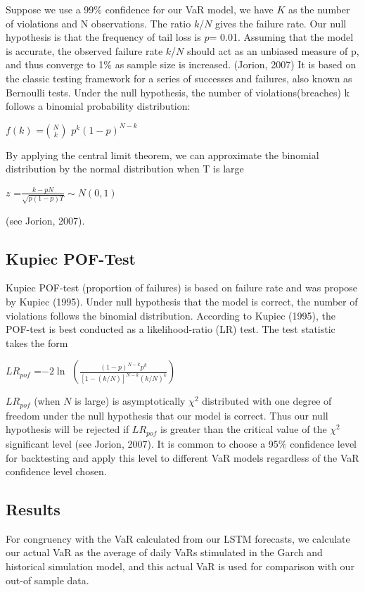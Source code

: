 \documentclass[a4paper,11pt,oneside]{book}
\begin{document}
Suppose we use a 99\% confidence for our VaR model, we have $K$ as the number of violations and N observations. The ratio $k$/$N$ gives the failure rate. Our null hypothesis is that the frequency of tail loss is $p$= 0.01. Assuming that the model is accurate, the observed failure rate $k$/$N$
should act as an unbiased measure of p, and thus converge to 1\% as sample size is
increased. (Jorion, 2007) \newline\newline
It is based on the classic testing framework for a series of successes and failures, also known as Bernoulli tests. Under the null hypothesis, the number of violations(breaches) k follows a binomial probability distribution:
\begin{center}
	$f(k)$ =$N \choose {k}$ $p^{k}(1-p)^{N-k}$ 
\end{center}

By applying the central limit theorem, we can approximate the binomial distribution by the normal distribution when T is large
\begin{center}
	$z$ =$\frac{k-pN}{\sqrt{p(1-p)T}}\sim N(0,1)$ 
\end{center}
(see Jorion, 2007).\newline

\subsection{Kupiec POF-Test}
Kupiec POF-test (proportion of failures) is based on failure rate and was propose by Kupiec (1995). Under null
hypothesis that the model is correct, the number of violations follows the
binomial distribution. According to Kupiec
(1995), the POF-test is best conducted as a likelihood-ratio (LR) test. The test
statistic takes the form
\begin{center}
	$LR_{pof}$ =$-2\ln$ $\left(\frac{(1-p)^{N-k}p^k}{[1-(k/N)]^{N-k}(k/N)^k}\right)$
\end{center}
$LR_{pof}$ (when $N$ is large) is asymptotically $\chi^2$ distributed with one degree of freedom under the null hypothesis that our model is correct. Thus our null hypothesis will be rejected if $LR_{pof}$ is greater than the critical value of the $\chi^2$ significant level (see Jorion, 2007). It is common to choose a 95\% confidence level for backtesting and apply this level to different VaR models regardless of the VaR confidence level chosen.
\newline

\subsection{Results}
For congruency with the VaR calculated from our LSTM forecasts, we calculate our actual VaR as the average of daily VaRs stimulated in the Garch and historical simulation model, and this actual VaR is used for comparison with our out-of sample data.\newline\newline\newline\newline
\end{document}
